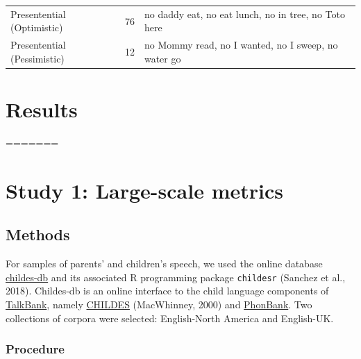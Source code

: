 \documentclass[man,floatsintext,draftall]{apa6}
\begin{document}
\begin{longtable}[]{@{}lll@{}}
\begin{minipage}[t]{0.27\columnwidth}\raggedright\strut
Presentential (Optimistic)\strut
\end{minipage} & \begin{minipage}[t]{0.16\columnwidth}\raggedright\strut
76\strut
\end{minipage} & \begin{minipage}[t]{0.39\columnwidth}\raggedright\strut
no daddy eat, no eat lunch, no in tree, no Toto here\strut
\end{minipage}\tabularnewline
\begin{minipage}[t]{0.27\columnwidth}\raggedright\strut
Presentential (Pessimistic)\strut
\end{minipage} & \begin{minipage}[t]{0.16\columnwidth}\raggedright\strut
12\strut
\end{minipage} & \begin{minipage}[t]{0.39\columnwidth}\raggedright\strut
no Mommy read, no I wanted, no I sweep, no water go\strut
\end{minipage}\tabularnewline
\bottomrule
\end{longtable}

\section{Results}\label{results-1}
=======
\hypertarget{study-1-large-scale-metrics}{%
\section{Study 1: Large-scale metrics}\label{study-1-large-scale-metrics}}

\hypertarget{methods}{%
\subsection{Methods}\label{methods}}

For samples of parents' and children's speech, we used the online database \href{childes-db.stanford.edu}{childes-db} and its associated R programming package \texttt{childesr} (Sanchez et al., 2018). Childes-db is an online interface to the child language components of \href{https://talkbank.org/}{TalkBank}, namely \href{https://childes.talkbank.org/}{CHILDES} (MacWhinney, 2000) and \href{https://phonbank.talkbank.org/}{PhonBank}. Two collections of corpora were selected: English-North America and English-UK.

\hypertarget{procedure}{%
\subsubsection{Procedure}\label{procedure}}
\end{document}
